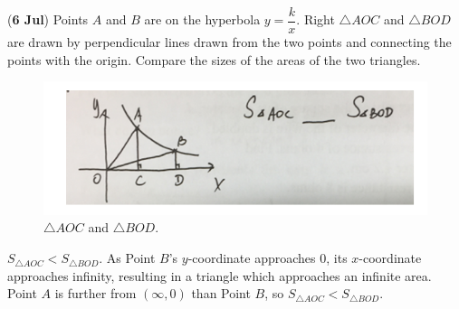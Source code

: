 \documentclass[12pt,answers]{exam}
\renewcommand{\frac}[2]{\dfrac{#1}{#2}}
\newcommand{\qndate}[2]{(\textbf{#1 #2})}
\begin{document}
\begin{questions}
  \question \qndate{6}{Jul} Points $A$ and $B$ are on the hyperbola
  $y = \frac{k}{x}$. Right $\triangle AOC$
  and $\triangle BOD$ are drawn by perpendicular lines drawn from the
  two points and connecting
  the points with the origin. Compare the sizes of the areas of the
  two triangles.
  \begin{figure}[htpb]
    \centering
    \includegraphics[scale=.8]{./images/0706_Tri.png}
    \caption{$\triangle AOC$ and $\triangle BOD$.}
    \label{fig:0706_Tri}
  \end{figure}
  \begin{solution}
    $S_{\triangle AOC} < S_{\triangle BOD}$.
    As Point $B$'s $y$-coordinate approaches 0, its $x$-coordinate
    approaches infinity,
    resulting in a triangle which approaches an infinite area. Point
    $A$ is further from
    $(\infty, 0)$ than Point $B$, so $S_{\triangle AOC} < S_{\triangle BOD}$.
  \end{solution}


\end{questions}
\end{document}
